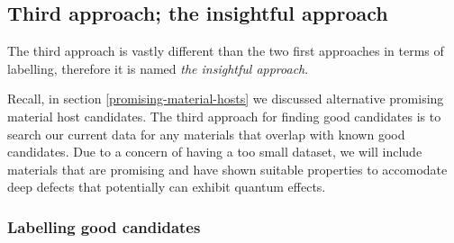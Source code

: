 \begin{table}[!ht]
\centering
\caption{A table showing the number of entries through the data mining process for good candidates in approach $2$ and bad candidates in approach $1$ and $2$.}
\label{tab:good-bad-candidates}
\noindent{}
\end{table}

\subsection{Third approach; the insightful approach}

The third approach is vastly different than the two first approaches in terms of labelling, therefore it is named \textit{the insightful approach}.

Recall, in section \ref{promising-material-hosts} we discussed alternative promising material host candidates. The third approach for finding good candidates is to search our current data for any materials that overlap with known good candidates. Due to a concern of having a too small dataset, we will include materials that are promising and have shown suitable properties to accomodate deep defects that potentially can exhibit quantum effects.


\subsubsection{Labelling good candidates}


